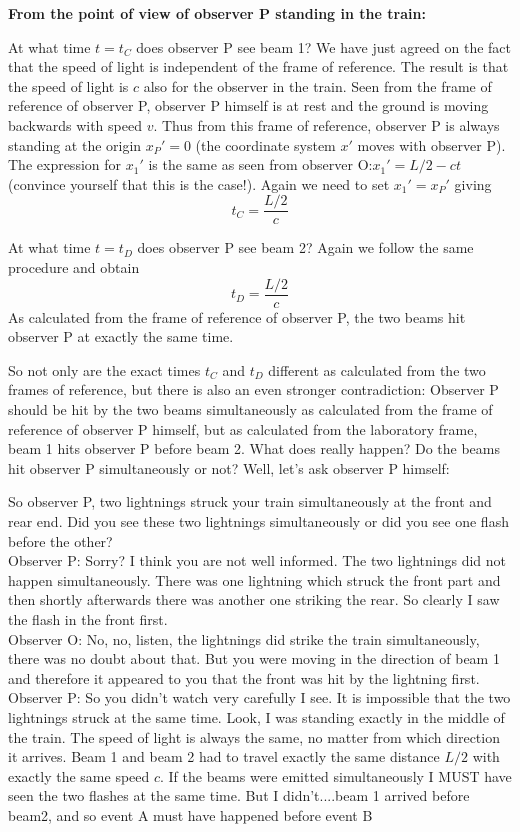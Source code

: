 {\begin{multicols}{2}
{\bf From the point of view of observer P standing in the train:}

At what time $t=t_C$ does observer P see beam 1? We have just agreed on the fact that the speed of light is independent of the frame of reference. The result is that the speed of light is $c$ also for the observer in the train. Seen from the frame of reference of observer P, observer P himself is at rest and the ground is moving backwards with speed $v$. Thus from this frame of reference, observer P is always standing at the origin $x_P'=0$ (the coordinate system $x'$ moves with observer P). The expression for $x_1'$ is the same as seen from observer O:$x_1'=L/2-ct$ (convince yourself that this is the case!). Again we need to set $x_1'=x_P'$ giving
\[
t_C=\frac{L/2}{c}
\]

At what time $t=t_D$ does observer P see beam 2? Again we follow the same procedure and obtain
\[
t_D=\frac{L/2}{c}
\]
As calculated from the frame of reference of observer P, the two beams hit observer P at exactly the same time.

So not only are the exact times $t_C$ and $t_D$ different as calculated from the two frames of reference, but there is also an even stronger contradiction: Observer P should be hit by the two beams simultaneously as calculated from the frame of reference of observer P himself, but as calculated from the laboratory frame, beam 1 hits observer P before beam 2. What does really happen? Do the beams hit observer P simultaneously or not? Well, let's ask observer P himself:

{\sf So observer P, two lightnings struck your train simultaneously at the front and rear end. Did you see these two lightnings simultaneously or did you see one flash before the other?}\\
{\sf Observer P: Sorry? I think you are not well informed. The two lightnings did not happen simultaneously. There was one lightning which struck the front part and then shortly afterwards there was another one striking the rear. So clearly I saw the flash in the front first.}\\
{\sf Observer O: No, no, listen, the lightnings did strike the train simultaneously, there was no doubt about that. But you were moving in the direction of beam 1 and therefore it appeared to you that the front was hit by the lightning first.}\\
{\sf Observer P: So you didn't watch very carefully I see. It is impossible that the two lightnings struck at the same time. Look, I was standing exactly in the middle of the train. The speed of light is always the same, no matter from which direction it arrives. Beam 1 and beam 2 had to travel exactly the same distance $L/2$ with exactly the same speed $c$. If the beams were emitted simultaneously I MUST have seen the two flashes at the same time. But I didn't....beam 1 arrived before beam2, and so event A must have happened before event B}


\end{multicols}}
